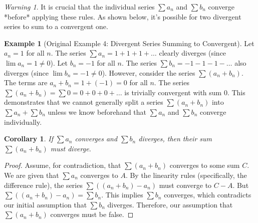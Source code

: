 \documentclass[11pt, letterpaper]{article}
\theoremstyle{plain} %
\newtheorem{corollary}[theorem]{Corollary} %
\theoremstyle{definition} %
\newtheorem{example}[theorem]{Example} %
\theoremstyle{remark} %
\newtheorem{warning}[theorem]{Warning} %
\begin{document}
\begin{warning}
It is crucial that the individual series $\sum a_n$ and $\sum b_n$ converge *before* applying these rules. As shown below, it's possible for two divergent series to sum to a convergent one.
\end{warning}

\begin{example}[Original Example 4: Divergent Series Summing to Convergent]
Let $a_n = 1$ for all $n$. The series $\sum a_n = 1+1+1+\dots$ clearly diverges (since $\lim a_n = 1 \neq 0$).
Let $b_n = -1$ for all $n$. The series $\sum b_n = -1-1-1-\dots$ also diverges (since $\lim b_n = -1 \neq 0$).
However, consider the series $\sum (a_n + b_n)$. The terms are $a_n + b_n = 1 + (-1) = 0$ for all $n$.
The series $\sum (a_n + b_n) = \sum 0 = 0+0+0+\dots$ is trivially convergent with sum 0.
This demonstrates that we cannot generally split a series $\sum(a_n+b_n)$ into $\sum a_n + \sum b_n$ unless we know beforehand that $\sum a_n$ and $\sum b_n$ converge individually.
\end{example}

\begin{corollary}
If $\sum a_n$ converges and $\sum b_n$ diverges, then their sum $\sum (a_n + b_n)$ must diverge.
\end{corollary}
\begin{proof}
Assume, for contradiction, that $\sum (a_n + b_n)$ converges to some sum $C$. We are given that $\sum a_n$ converges to $A$. By the linearity rules (specifically, the difference rule), the series $\sum ((a_n + b_n) - a_n)$ must converge to $C-A$. But $\sum ((a_n + b_n) - a_n) = \sum b_n$. This implies $\sum b_n$ converges, which contradicts our initial assumption that $\sum b_n$ diverges. Therefore, our assumption that $\sum(a_n+b_n)$ converges must be false.
\end{proof}
\end{document}

